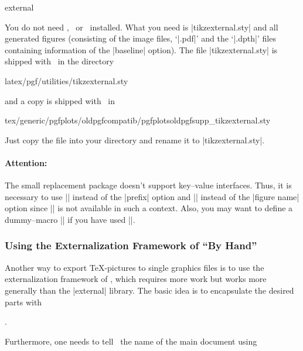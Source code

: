 {\begin{pgfplotslibrary}{external}
\begin{codeexample}
\end{codeexample}
You do not need \pgfname, \tikzname\ or \PGFPlots\ installed. What you need is |tikzexternal.sty| and all generated figures (consisting of the image files, `|.pdf|' and the `|.dpth|' files containing information of the |baseline| option). The file |tikzexternal.sty| is shipped with \pgfname\ in the directory
\begin{codeexample}
latex/pgf/utilities/tikzexternal.sty
\end{codeexample}
and a copy is shipped with \PGFPlots\ in
\begin{codeexample}
tex/generic/pgfplots/oldpgfcompatib/pgfplotsoldpgfsupp_tikzexternal.sty
\end{codeexample}
Just copy the file into your directory and rename it to |tikzexternal.sty|.

\paragraph{Attention:} The small replacement package doesn't support key--value interfaces. Thus, it is necessary to use || instead of the |prefix| option and || instead of the |figure name| option since |\tikzset| is not available in such a context. Also, you may want to define a dummy--macro |\pgfplotsset| if you have used |\pgfplotsset|.
\end{pgfplotslibrary}

\subsubsection[Using the Externalization Framework of PGF By Hand]{Using the Externalization Framework of {\normalfont\pgfname} ``By Hand''}
Another way to export \TeX-pictures to single graphics files is to use the externalization framework of \pgfname, which requires more work but works more generally than the |external| library.
The basic idea is to encapsulate the desired parts with

\declareandlabel{\beginpgfgraphicnamed}


\declareandlabel{\endpgfgraphicnamed}. 

\noindent Furthermore, one needs to tell \pgfname\ the name of the main document using

\declareandlabel{\pgfrealjobname}

}

